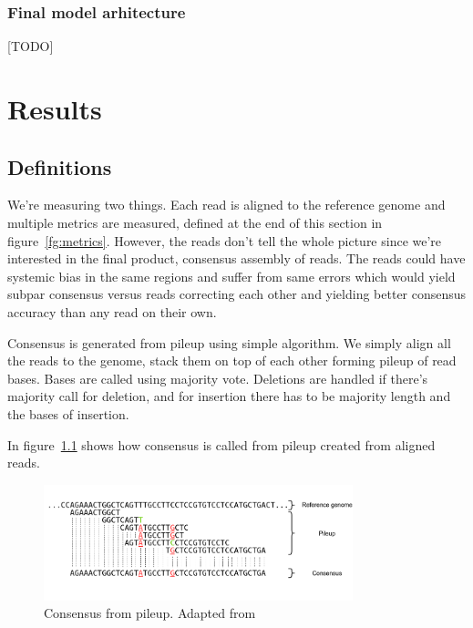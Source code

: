 \documentclass[times, utf8, diplomski, english]{fer}
\begin{document}
\subsection{Final model arhitecture}
\label{subsec:final-model-architecture}

[TODO]

\chapter{Results}
\label{chap:results}

\section{Definitions}
We're measuring two things. Each read is aligned to the reference genome and multiple metrics are measured, defined at the end of this section in figure~\ref{fg:metrics}. However, the reads don't tell the whole picture since we're interested in the final product, consensus assembly of reads. The reads could have systemic bias in the same regions and suffer from same errors which would yield subpar consensus versus reads correcting each other and yielding better consensus accuracy than any read on their own.

Consensus is generated from pileup using simple algorithm. We simply align all the reads to the genome, stack them on top of each other forming pileup of read bases. Bases are called using majority vote. Deletions are handled if there's majority call for deletion, and for insertion there has to be majority length and the bases of insertion. 

In figure~\ref{fg:consensus} shows how consensus is called from pileup created from aligned reads. 

\begin{figure}
	\begin{center}
		\includegraphics[width=0.8\textwidth]{consnesus}
		\caption{Consensus from pileup. Adapted from~\citep{mratkovic}}
		\label{fg:consensus}
	\end{center}
\end{figure}
\end{document}
